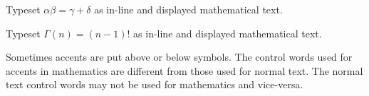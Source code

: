  
 
\exercise Typeset $\alpha\beta=\gamma+\delta$ as in-line and displayed 
mathematical text. 
 
\exercise Typeset $\Gamma(n) = (n-1)!$ as in-line and displayed 
mathematical text. 
 
Sometimes accents are put above or below symbols.  The control 
words used for accents in mathematics are different from those 
used for normal text.   The normal text control words may not be 
used for mathematics and vice-versa. 
 
 
 
 
 
